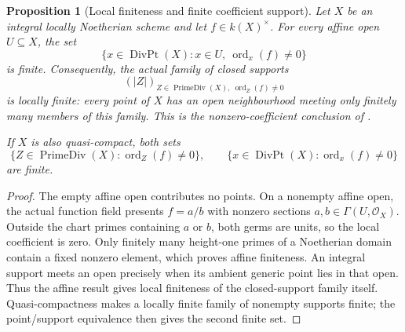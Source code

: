 \documentclass[11pt]{article}
\newtheorem{proposition}[theorem]{Proposition}
\theoremstyle{definition}
\theoremstyle{remark}
\begin{document}
\begin{proposition}[Local finiteness and finite coefficient support]
\label{prop:divisor-finiteness}
Let \(X\) be an integral locally Noetherian scheme and let
\(f\in k(X)^\times\). For every affine open \(U\subseteq X\), the set
\[
  \{x\in\operatorname{DivPt}(X):x\in U,
      \ \operatorname{ord}_x(f)\ne0\}
\]
is finite. Consequently, the actual family of closed supports
\[
  (|Z|)_{Z\in\operatorname{PrimeDiv}(X),\ \operatorname{ord}_Z(f)\ne0}
\]
is locally finite: every point of \(X\) has an open neighbourhood meeting
only finitely many members of this family. This is the nonzero-coefficient
conclusion of \cite{StacksDivisorLocalFiniteness}.

If \(X\) is also quasi-compact, both sets
\[
  \{Z\in\operatorname{PrimeDiv}(X):\operatorname{ord}_Z(f)\ne0\},
  \qquad
  \{x\in\operatorname{DivPt}(X):\operatorname{ord}_x(f)\ne0\}
\]
are finite.
\end{proposition}

\begin{proof}
The empty affine open contributes no points. On a nonempty affine open,
the actual function field presents \(f=a/b\) with nonzero sections
\(a,b\in\Gamma(U,\mathcal O_X)\). Outside the chart primes containing
\(a\) or \(b\), both germs are units, so the local coefficient is zero.
Only finitely many height-one primes of a Noetherian domain contain a
fixed nonzero element, which proves affine finiteness.
An integral support meets an open precisely when its ambient generic
point lies in that open. Thus the affine result gives local finiteness
of the closed-support family itself. Quasi-compactness makes a locally
finite family of nonempty supports finite; the point/support equivalence
then gives the second finite set.
\end{proof}
\end{document}
